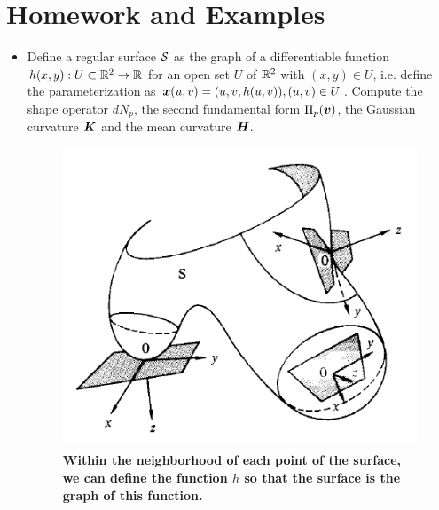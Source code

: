 \documentclass[11pt]{article}
\begin{document}
\section{Homework and Examples}
\begin{itemize}
\item  \begin{example}
Define a regular surface ${\mathcal S}$ as the graph of a differentiable function $h(x,y): U \subset {\mathbb R}^{2} \rightarrow {\mathbb R}$ for an open set $U$ of ${\mathbb R}^{2}$ with $(x,y)\in U$, i.e. define the parameterization as $\boldsymbol{x}(u,v) = (u,v, h(u,v)), (u,v)\in U$. Compute the shape operator $dN_{p}$, the second fundamental form $\Pi_{p}(\boldsymbol{v})$, the Gaussian curvature $\boldsymbol{K}$ and the mean curvature $\boldsymbol{H}$.
\end{example}
\begin{figure}[thb]
\centering
\begin{minipage}{0.5\linewidth}
 \centerline{\includegraphics[scale = 0.5]{hessian_fund.png}}
\end{minipage}
\caption{\scriptsize
\textbf{Within the neighborhood of each point of the surface, we can define the function $h$ so that the surface is the graph of this function.}}
\end{figure}


\end{itemize}
\end{document}
